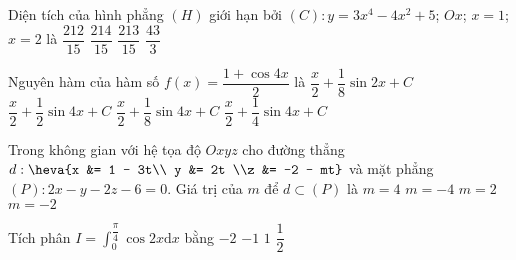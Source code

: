 \begin{ex}%
Diện tích của hình phẳng $(H)$ giới hạn bởi $(C): y = 3x^4 - 4x^2 + 5$; $Ox$; $x = 1$; $x = 2$ là 
\choice
{$\dfrac{212}{15}$}
{\True $\dfrac{214}{15}$}
{$\dfrac{213}{15}$}
{$\dfrac{43}{3}$}
\end{ex}



\begin{ex}%
Nguyên hàm của hàm số $f(x) =  \dfrac{1 + \cos 4x}{2}$ là
\choice
{$\dfrac{x}{2} + \dfrac{1}{8} \sin 2x + C$}
{$\dfrac{x}{2} + \dfrac{1}{2} \sin 4x + C$}
{\True $\dfrac{x}{2} + \dfrac{1}{8} \sin 4x + C$}
{$\dfrac{x}{2} + \dfrac{1}{4} \sin 4x + C$}
\end{ex}




\begin{ex}%
Trong không gian với hệ tọa độ $Oxyz$ cho đường thẳng $d: \heva{x &= 1 - 3t\\ y &= 2t \\z &= -2 - mt}$ và mặt phẳng $(P): 2x - y - 2z - 6 = 0$. Giá trị của $m$ để $d \subset (P)$ là 
\choice
{\True $m = 4$}
{$m = -4$}
{$m = 2$}
{$m = -2$}
\end{ex}



\begin{ex}%
Tích phân $I = \displaystyle \int_0^{\dfrac{\pi}{4}} \cos 2x \mathrm{d}x$ bằng
\choice
{$-2$}
{$-1$}
{$1$}
{\True $\dfrac{1}{2}$}
\end{ex}





